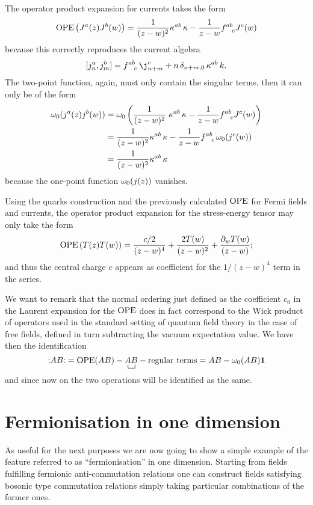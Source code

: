  \begin{example}
 The operator product expansion for currents takes the
 form 
 \[
 \operatorname{OPE}\left(J^a(z)J^b(w)\right)=\frac{1}{(z-w)^2}
 \kappa^{ab}\,\kappa-\frac{1}{z-w}f^{ab}_{\phantom{ab}c}
 J^c(w)
 \]
 because this correctly reproduces the current 
 algebra
 \[
 \comm{j^a_n,j^b_m}=f^{ab}_{\phantom{ab}c}\,\j^c_{n+m}
 +n\,\delta_{n+m,0}\,\kappa^{ab}\,k.
 \]
 The two-point function, again, must only contain
 the singular terms, then it can only be of the form
 \begin{align*}
 \omega_0(j^a(z)j^b(w))&=\omega_0\left(\frac{1}{(z-w)^2}\right.
 \kappa^{ab}\,\kappa-\frac{1}{z-w}
 f^{ab}_{\phantom{ab}c} J^c(w)\bigg)\\
 &=\frac{1}{(z-w)^2}\kappa^{ab}\,\kappa-\frac{1}{z-w}
 f^{ab}_{\phantom{ab}c}\,\omega_0(j^c(w))\\
 &=\frac{1}{(z-w)^2}\kappa^{ab}\,\kappa
 \end{align*}
 because the one-point function $\omega_0(j(z))$ vanishes.
 \end{example}
 \begin{example}
 Using the quarks construction and the previously 
 calculated $\operatorname{OPE}$ for Fermi fields and currents, the 
 operator product expansion for the stress-energy 
 tensor may only take the form 
 \[
 \operatorname{OPE}\left(T(z)T(w)\right)=\frac{c/2}{(z-w)^4}
 + \frac{2T(w)}{(z-w)^2}+\frac{\partial_w T(w)}{(z-w)};
 \]
 and thus the central charge $c$ appears as coefficient for the
 $1/(z-w)^4$ term in the series.
 \end{example}
 We want to remark that the normal ordering just defined
 as the coefficient $c_0$ in the Laurent expansion
 for the $\operatorname{OPE}$ does in fact correspond to the Wick
 product of operators used in the standard setting
 of quantum field theory in the case of free fields, 
 defined in turn subtracting
 the vacuum expectation value. We have then the 
 identification
 \[
 \wick{AB}=\OPE(AB)-\bcontraction{}{A}{}{B}AB
 -\text{regular terms} = AB -\vac(AB)\bm{1}
 \]
 and since now on the two operations will
 be identified as the same.
 
 \section{Fermionisation in one dimension}
 \label{1D-fermionisation}
 As useful for the next purposes we are now going
 to show a simple example of the feature 
 referred to as ``fermionisation'' in one dimension.
 Starting from fields fulfilling fermionic anti-commutation
 relations one can construct fields satisfying 
 bosonic type commutation relations simply taking
 particular combinations of the former ones.
 
